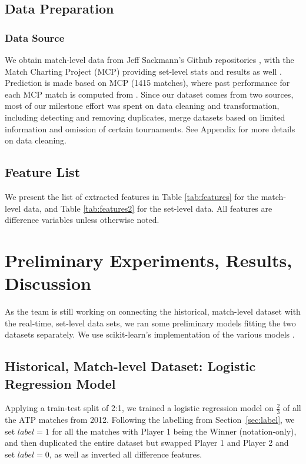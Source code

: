\documentclass[paper=a4, fontsize=11pt]{scrartcl} %
\numberwithin{equation}{section} %
\numberwithin{figure}{section} %
\numberwithin{table}{section} %
\begin{document}
\subsection{Data Preparation}
\subsubsection{Data Source}
We obtain match-level data from Jeff Sackmann's Github repositories \cite{tennis_atp} \cite{tennis_charting}, with the Match Charting Project (MCP) providing set-level stats and results as well \cite{tennis_charting}. Prediction is made based on MCP (1415 matches), where past performance for each MCP match is computed from \cite{tennis_atp}. Since our dataset comes from two sources, most of our milestone effort was spent on data cleaning and transformation, including detecting and removing duplicates, merge datasets based on limited information and omission of certain tournaments.  See Appendix for more details on data cleaning.
\subsection{Feature List}
We present the list of extracted features in Table \ref{tab:features} for the match-level data, and Table \ref{tab:features2} for the set-level data.  All features are difference variables unless otherwise noted. 



\section{Preliminary Experiments, Results, Discussion}
As the team is still working on connecting the historical, match-level dataset with the real-time, set-level data sets, we ran some preliminary models fitting the two datasets separately. We use scikit-learn's implementation of the various models \cite{scikit-learn}.
\subsection{Historical, Match-level Dataset: Logistic Regression Model}
Applying a train-test split of 2:1, we trained a logistic regression model on $\frac{2}{3}$ of all the ATP matches from 2012. Following the labelling from Section~\ref{sec:label}, we set $label = 1$ for all the matches with Player 1 being the Winner (notation-only), and then duplicated the entire dataset but swapped Player 1 and Player 2 and set $label = 0$, as well as inverted all difference features.
\end{document}
